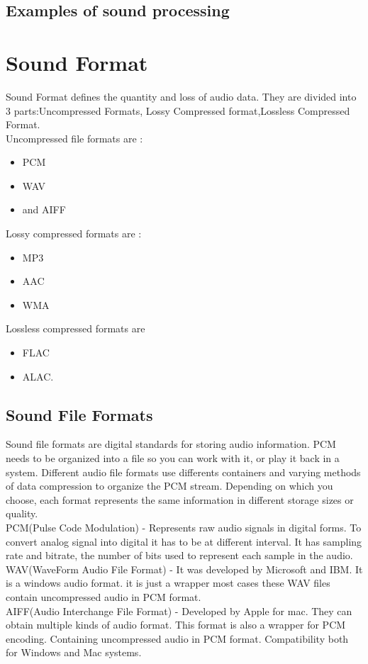 \documentclass[english,12pt,oneside,a4paper]{article}
\begin{document}
\begin{center}
		\subsection{Examples of sound processing}
		
		\section{Sound Format}
		Sound Format defines the  quantity and loss of audio data.
		They are divided into 3 parts:Uncompressed Formats,	Lossy Compressed format,Lossless Compressed Format.
		\\
		Uncompressed file formats are :
		\begin{itemize}
		\item PCM
		\item WAV 
		\item and AIFF
		\end{itemize}
		Lossy compressed formats are : 
		\begin{itemize}
		\item MP3
		\item AAC
		\item WMA
		\end{itemize}
		Lossless compressed formats are
		\begin{itemize}
		\item FLAC
		\item ALAC.
		\end{itemize}
		
		\subsection{Sound File Formats}
		Sound file formats are digital standards for storing audio information. PCM needs to be organized into a file so you can work with it, or play it back in a system. Different audio file formats use differents containers and varying methods of data compression to organize the PCM stream. Depending on which you choose, each format represents the same information in different storage sizes or quality.\\
		PCM(Pulse Code Modulation) - Represents raw audio signals in digital forms. To convert analog signal into digital it has to be at different interval. It has sampling rate and bitrate, the number of bits used to represent each sample in the audio.\\
		WAV(WaveForm Audio File Format) - It was developed by Microsoft and IBM. It is a windows audio format. it is just a wrapper most cases these WAV files contain uncompressed audio in PCM format.\\
		AIFF(Audio Interchange File Format) - Developed by Apple for mac.
		They can obtain multiple kinds of audio format. This format is also a wrapper for PCM encoding. Containing uncompressed audio in PCM format. Compatibility both for Windows and Mac systems.
		

\end{center}
\end{document}
